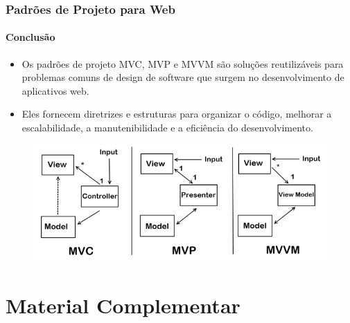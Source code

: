\documentclass[
	9pt, %
	t, %
]{beamer}
\begin{document}
\begin{frame}
	\frametitle{Padrões de Projeto para Web}
	\framesubtitle{Conclusão}

	\begin{itemize}
		\item Os padrões de projeto MVC, MVP e MVVM são soluções reutilizáveis para problemas comuns de design de software que surgem no desenvolvimento de aplicativos web.
		\item Eles fornecem diretrizes e estruturas para organizar o código, melhorar a escalabilidade, a manutenibilidade e a eficiência do desenvolvimento.
	\end{itemize}

	\begin{figure}
		\centering
		\includegraphics[width=0.9\linewidth]{mvc_mvp_mvvm_dif.png}
	\end{figure}

\end{frame}

\section{Material Complementar}
\end{document}
